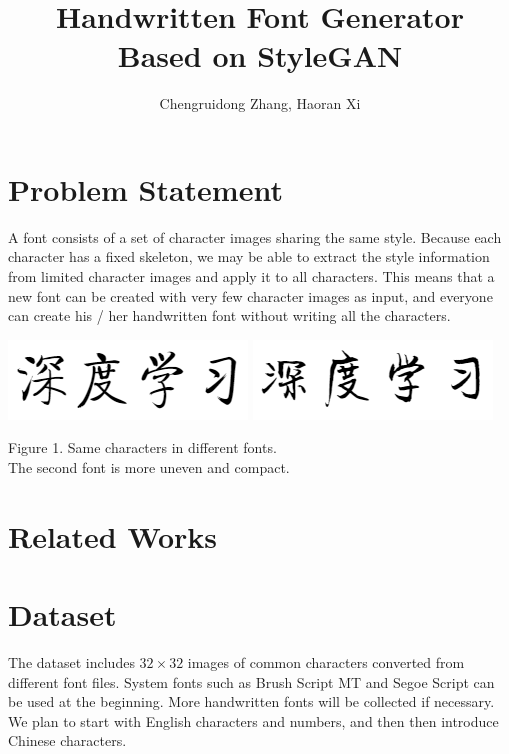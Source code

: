 \documentclass[letterpaper]{article}
\begin{document}
%
\title{Handwritten Font Generator \\ Based on StyleGAN}
\author{Chengruidong Zhang, Haoran Xi}
\maketitle

\section{Problem Statement}
A font consists of a set of character images sharing the same style. Because each character has a fixed skeleton, we may be able to extract the style information from limited character images and apply it to all characters. This means that a new font can be created with very few character images as input, and everyone can create his / her handwritten font without writing all the characters.

\begin{center}
    \includegraphics[]{proposal-fig-qiti.png}
    \includegraphics[]{proposal-fig-jinglei.png}

    Figure 1. Same characters in different fonts.\\The second font is more uneven and compact.
\end{center}


\section{Related Works}

\section{Dataset}
The dataset includes $32 \times 32$ images of common characters converted from different font files. System fonts such as Brush Script MT and Segoe Script can be used at the beginning. More handwritten fonts will be collected if necessary. We plan to start with English characters and numbers, and then then introduce Chinese characters.
\end{document}
